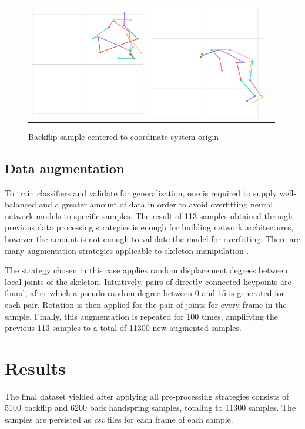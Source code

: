 \begin{figure}
\begin{tabular}{ccc}
\includegraphics[width=5cm]{images/data-preprocessing/centered-backflip-skel-part-5}&
\includegraphics[width=5cm]{images/data-preprocessing/centered-backflip-skel-part-6}\\
\end{tabular}
    \caption{Backflip sample centered to coordinate system origin}
    \label{centered-backflip-4-rasmus}
\end{figure}

\subsection{Data augmentation}

To train classifiers and validate for generalization, one is required to supply well-balanced and a greater amount of data in order to avoid overfitting neural network models to specific samples. The result of 113 samples obtained through previous data processing strategies is enough for building network architectures, however the amount is not enough to validate the model for overfitting. There are many augmentation strategies applicable to skeleton manipulation \cite{NUNEZ201880}. 

The strategy chosen in this case applies random displacement degrees between local joints of the skeleton. Intuitively, pairs of directly connected keypoints are found, after which a pseudo-random degree between 0 and 15 is generated for each pair. Rotation is then applied for the pair of joints for every frame in the sample. Finally, this augmentation is repeated for 100 times, amplifying the previous 113 samples to a total of 11300 new augmented samples.

\section{Results}
\label{pre-processing-results}

The final dataset yielded after applying all pre-processing strategies consists of 5100 backflip and 6200 back handspring samples, totaling to 11300 samples. The samples are persisted as \textit{csv} files for each frame of each sample.

